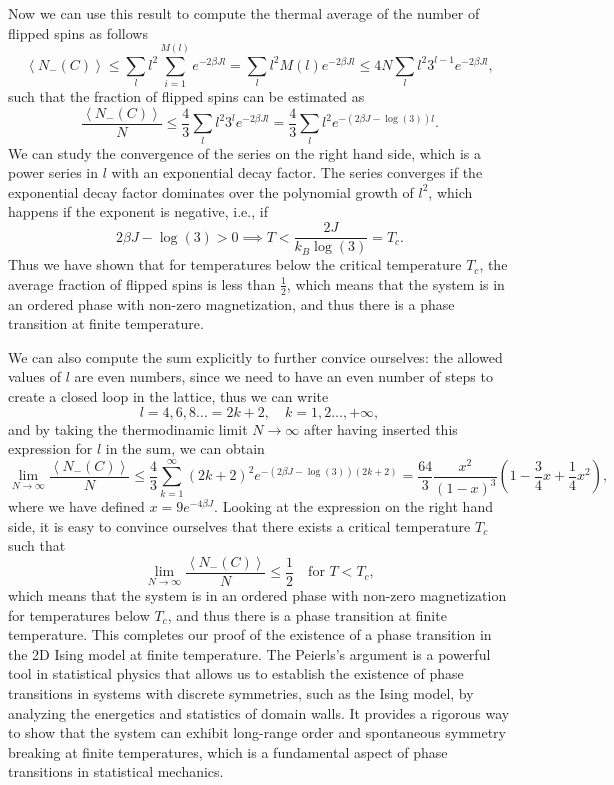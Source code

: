 Now we can use this result to compute the thermal average of the number of flipped spins as follows
\[
  \left\langle N_{-}(C) \right\rangle \leq \sum_{l} l^2 \sum_{i=1}^{M(l)} e^{-2 \beta J l} = \sum_{l} l^2 M(l) e^{-2 \beta J l} \leq 4 N \sum_{l} l^2 3^{l-1} e^{-2 \beta J l},
\]
such that the fraction of flipped spins can be estimated as
\[
  \frac{\left\langle N_{-}(C) \right\rangle}{N} \leq \frac{4}{3} \sum_{l} l^2 3^{l} e^{-2 \beta J l} = \frac{4}{3} \sum_{l} l^2 e^{-(2 \beta J - \log(3)) l}.
\]
We can study the convergence of the series on the right hand side, which is a power series in \(l\) with an exponential decay factor. The series converges if the exponential decay factor dominates over the polynomial growth of \(l^2\), which happens if the exponent is negative, i.e., if
\[
  2 \beta J - \log(3) > 0 \implies T < \frac{2 J}{k_B \log(3)} = T_c.
\]
Thus we have shown that for temperatures below the critical temperature \(T_c\), the average fraction of flipped spins is less than \(\frac{1}{2}\), which means that the system is in an ordered phase with non-zero magnetization, and thus there is a phase transition at finite temperature.

We can also compute the sum explicitly to further convice ourselves: the allowed values of \(l\) are even numbers, since we need to have an even number of steps to create a closed loop in the lattice, thus we can write
\[
  l = 4,6,8\dots = 2k+2, \quad k = 1,2\dots, +\infty,
\]
and by taking the thermodinamic limit \(N \to \infty\) after having inserted this expression for \(l\) in the sum, we can obtain
\[
  \lim_{N \to \infty} \frac{\left\langle N_{-}(C) \right\rangle}{N} \leq \frac{4}{3} \sum_{k=1}^{\infty} (2k+2)^2 e^{-(2 \beta J - \log(3)) (2k+2)} = \frac{64}{3} \frac{x^2}{(1-x)^3}\left(1 - \frac{3}{4}x + \frac{1}{4}x^2\right),
\]
where we have defined \(x = 9 e^{-4 \beta J}\). Looking at the expression on the right hand side, it is easy to convince ourselves that there exists a critical temperature \(T_c\) such that
\[
  \lim_{N \to \infty} \frac{\left\langle N_{-}(C) \right\rangle}{N} \leq \frac{1}{2} \quad \text{for } T < T_c,
\]
which means that the system is in an ordered phase with non-zero magnetization for temperatures below \(T_c\), and thus there is a phase transition at finite temperature. This completes our proof of the existence of a phase transition in the 2D Ising model at finite temperature. The Peierls's argument is a powerful tool in statistical physics that allows us to establish the existence of phase transitions in systems with discrete symmetries, such as the Ising model, by analyzing the energetics and statistics of domain walls. It provides a rigorous way to show that the system can exhibit long-range order and spontaneous symmetry breaking at finite temperatures, which is a fundamental aspect of phase transitions in statistical mechanics.


